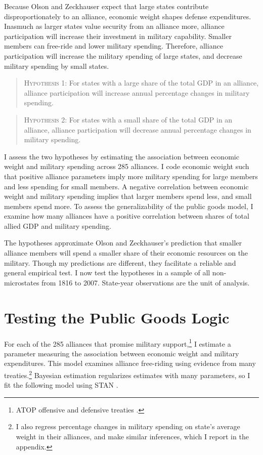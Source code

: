 \documentclass[12pt]{article}
\begin{document}
Because Olson and Zeckhauser expect that large states contribute disproportionately to an alliance, economic weight shapes defense expenditures. 
Inasmuch as larger states value security from an alliance more, alliance participation will increase their investment in military capability.
Smaller members can free-ride and lower military spending. 
Therefore, alliance participation will increase the military spending of large states, and decrease military spending by small states. 


\begin{quote}
\textsc{Hypothesis 1}: For states with a large share of the total GDP in an alliance, alliance participation will increase annual percentage changes in military spending. 
\end{quote}


\begin{quote}
\textsc{Hypothesis 2}: For states with a small share of the total GDP in an alliance, alliance participation will decrease annual percentage changes in military spending.
\end{quote}


I assess the two hypotheses by estimating the association between economic weight and military spending across 285 alliances. 
I code economic weight such that positive alliance parameters imply more military spending for large members and less spending for small members. 
A negative correlation between economic weight and military spending implies that larger members spend less, and small members spend more. 
To assess the generalizability of the public goods model, I examine how many alliances have a positive correlation between shares of total allied GDP and military spending.  
 

The hypotheses approximate Olson and Zeckhauser's prediction that smaller alliance members will spend a smaller share of their economic resources on the military. 
Though my predictions are different, they facilitate a reliable and general empirical test.
I now test the hypotheses in a sample of all non-microstates from 1816 to 2007. 
State-year observations are the unit of analysis.


\section{Testing the Public Goods Logic}


For each of the 285 alliances that promise military support,\footnote{ATOP offensive and defensive treaties \citep{Leedsetal2002}.} I estimate a parameter measuring the association between economic weight and military expenditures. 
This model examines alliance free-riding using evidence from many treaties.\footnote{I also regress percentage changes in military spending on state's average weight in their alliances, and make similar inferences, which I report in the appendix.}
Bayesian estimation regularizes estimates with many parameters, so I fit the following model using STAN \citep{Carpenteretal2016}.
\end{document}
